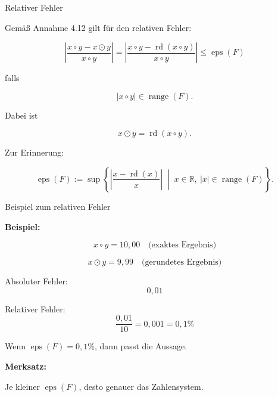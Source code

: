 \documentclass{beamer}
\begin{document}
\begin{frame}{Relativer Fehler}

\scriptsize

Gemäß Annahme 4.12 gilt für den relativen Fehler:

\vspace{0.3cm}

\[
\left|
\frac{x\circ y-x\odot y}{x\circ y}
\right|
=
\left|
\frac{x\circ y-\operatorname{rd}(x\circ y)}{x\circ y}
\right|
\leq \operatorname{eps}(F)
\]

\vspace{0.3cm}

falls

\[
|x\circ y|\in \operatorname{range}(F).
\]

\vspace{0.5cm}

Dabei ist

\[
x\odot y=\operatorname{rd}(x\circ y).
\]

\vspace{0.5cm}

Zur Erinnerung:

\[
\operatorname{eps}(F):=
\sup\left\{
\left|
\frac{x-\operatorname{rd}(x)}{x}
\right|
\;\middle|\;
x\in\mathbb{R},\ |x|\in\operatorname{range}(F)
\right\}.
\]

\end{frame}

\begin{frame}{Beispiel zum relativen Fehler}

\small

\textbf{Beispiel:}

\[
x\circ y = 10{,}00 \quad \text{(exaktes Ergebnis)}
\]

\[
x\odot y = 9{,}99 \quad \text{(gerundetes Ergebnis)}
\]

\vspace{0.5cm}

Absoluter Fehler:
\[
0{,}01
\]

Relativer Fehler:
\[
\frac{0{,}01}{10} = 0{,}001 = 0{,}1\%
\]

\vspace{0.5cm}

Wenn \(\operatorname{eps}(F)=0{,}1\%\), dann passt die Aussage.

\vspace{0.6cm}

\textbf{Merksatz:}

Je kleiner \(\operatorname{eps}(F)\), desto genauer das Zahlensystem.

\end{frame}
\end{document}
